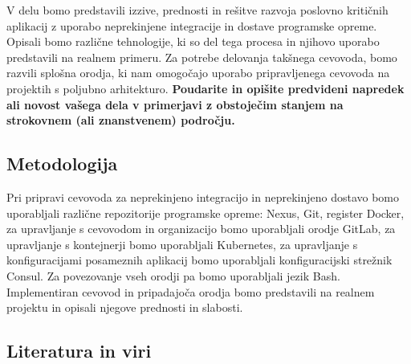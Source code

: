 \documentclass[a4paper, 12pt]{article}
\newcommand\cmnt[1]{\textcolor{munsell}{#1}}
\begin{document}
V delu bomo predstavili izzive, prednosti in rešitve razvoja poslovno kritičnih aplikacij z uporabo neprekinjene integracije in dostave programske opreme. Opisali bomo različne tehnologije, ki so del tega procesa in njihovo uporabo predstavili na realnem primeru. Za potrebe delovanja takšnega cevovoda, bomo razvili splošna orodja, ki nam omogočajo uporabo pripravljenega cevovoda na projektih s poljubno arhitekturo. \textbf{Poudarite in opišite predvideni napredek ali novost vašega dela v primerjavi z obstoječim stanjem na strokovnem (ali znanstvenem) področju.}



\subsection{Metodologija}

Pri pripravi cevovoda za neprekinjeno integracijo in neprekinjeno dostavo bomo uporabljali različne repozitorije programske opreme: Nexus, Git, register Docker, za upravljanje s cevovodom in organizacijo bomo uporabljali orodje GitLab, za upravljanje s kontejnerji bomo uporabljali Kubernetes, za upravljanje s konfiguracijami posameznih aplikacij bomo uporabljali konfiguracijski strežnik Consul. Za povezovanje vseh orodji pa bomo uporabljali jezik Bash. Implementiran cevovod in pripadajoča orodja bomo predstavili na realnem projektu in opisali njegove prednosti in slabosti.


\subsection{Literatura in viri}
\label{literatura}


\renewcommand\refname{}
\vspace{-50px}




%
\end{document}
